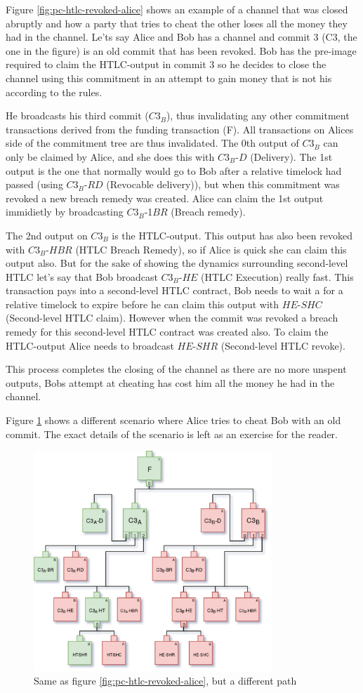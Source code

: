 Figure \ref{fig:pc-htlc-revoked-alice} shows an example of a channel that was closed abruptly and how a party that tries to cheat the other loses all the money they had in the channel. Le'ts say Alice and Bob has a channel and commit 3 (C3, the one in the figure) is an old commit that has been revoked. Bob has the pre-image required to claim the HTLC-output in commit 3 so he decides to close the channel using this commitment in an attempt to gain money that is not his according to the rules. 

He broadcasts his third commit ($C3_{B}$), thus invalidating any other commitment transactions derived from the funding transaction (F). All transactions on Alices side of the commitment tree are thus invalidated. The 0th output of $C3_{B}$ can only be claimed by Alice, and she does this with $C3_B$-$D$ (Delivery). The 1st output is the one that normally would go to Bob after a relative timelock had passed (using $C3_B$-$RD$ (Revocable delivery)), but when this commitment was revoked a new breach remedy was created. Alice can claim the 1st output immidietly by broadcasting $C3_B$-1$BR$ (Breach remedy).

The 2nd output on $C3_{B}$ is the HTLC-output. This output has also been revoked with $C3_B$-$HBR$ (HTLC Breach Remedy), so if Alice is quick she can claim this output also. But for the sake of showing the dynamics surrounding second-level HTLC let's say that Bob broadcast $C3_B$-$HE$ (HTLC Execution) really fast. This transaction pays into a second-level HTLC contract, Bob needs to wait a for a relative timelock to expire before he can claim this output with $HE$-$SHC$ (Second-level HTLC claim). However when the commit was revoked a breach remedy for this second-level HTLC contract was created also. To claim the HTLC-output Alice needs to broadcast $HE$-$SHR$ (Second-level HTLC revoke).

This process completes the closing of the channel as there are no more unspent outputs, Bobs attempt at cheating has cost him all the money he had in the channel. 

Figure \ref{fig:pc-htlc-revoked-bob} shows a different scenario where Alice tries to cheat Bob with an old commit. The exact details of the scenario is left as an exercise for the reader.

\begin{figure}[H]
	\centering
	\includegraphics[width=0.80\textwidth]{background/images/payment_channel_htlc_revoked_bob.png}
	\caption{Same as figure \ref{fig:pc-htlc-revoked-alice}, but a different path}
	\label{fig:pc-htlc-revoked-bob}
\end{figure}
